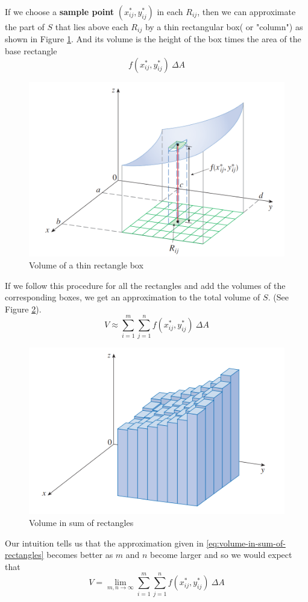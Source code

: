 \documentclass[math,code]{amznotes}
\theoremstyle{remark}
\begin{document}
If we choose a \textbf{sample point} $(x_{ij}^{*},y_{ij}^{*})$ in each $R_{ij}$, then we can approximate the part of $S$ that lies above each $R_{ij}$ by a thin rectangular box( or "column") as shown in Figure \ref{fig:volume-of-thin-rect-box}. And its volume is the height of the box times the area of the base rectangle
\begin{displaymath}
    f(x_{ij}^{*},y_{ij}^{*})~\Delta A
\end{displaymath}
\begin{figure}[H]
    \centering
    \includegraphics[width=0.5\linewidth]{images/double-integral-riemann-sum-2.png}
    \caption{Volume of a thin rectangle box}
    \label{fig:volume-of-thin-rect-box}
\end{figure}
If we follow this procedure for all the rectangles and add the volumes of the corresponding boxes, we get an approximation to the total volume of $S$. (See Figure \ref{fig:volume-in-sum-of-rectangles}).
\begin{equation} \label{eq:volume-in-sum-of-rectangles}
    V \approx \sum_{i=1}^{m} \sum_{j=1}^{n} f(x_{ij}^{*},y_{ij}^{*}) ~\Delta A
\end{equation}
\begin{figure}[H]
    \centering
    \includegraphics[width=0.5\linewidth]{images/double-integral-riemann-sum-3.png}
    \caption{Volume in sum of rectangles}
    \label{fig:volume-in-sum-of-rectangles}
\end{figure}
Our intuition tells us that the approximation given in \eqref{eq:volume-in-sum-of-rectangles} becomes better as $m$ and $n$ become larger and so we would expect that
\begin{equation} \label{eq:riemann-sum-volume-version}
    V = \lim\limits_{m,n \to \infty} \sum_{i=1}^{m} \sum_{j=1}^{n} f(x_{ij}^{*},y_{ij}^{*}) ~\Delta A
\end{equation}
\end{document}
